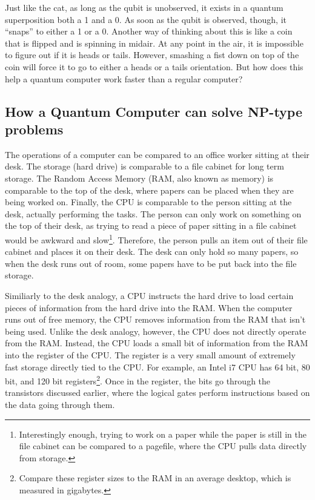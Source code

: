 \documentclass[10pt,journal,compsoc]{IEEEtran}
\begin{document}
Just like the cat, as long as the qubit is unobserved, it exists in a quantum superposition both a 1 and a 0. As soon as the qubit is observed, though, it ``snaps'' to either a 1 or a 0. Another way of thinking about this is like a coin that is flipped and is  spinning in midair. At any point in the air, it is impossible to figure out if it is heads or tails. However, smashing a fist down on top of the coin will force it to go to either a heads or a tails orientation. But how does this help a quantum computer work faster than a regular computer?







\subsection{How a Quantum Computer can solve NP-type problems}

The operations of a computer can be compared to an office worker sitting at their desk. The storage (hard drive) is comparable to a file cabinet for long term storage. The Random Access Memory (RAM, also known as memory) is comparable to the top of the desk, where papers can be placed when they are being worked on. Finally, the CPU is comparable to the person sitting at the desk, actually performing the tasks. The person can only work on something on the top of their desk, as trying to read a piece of paper sitting in a file cabinet would be awkward and slow\footnote{Interestingly enough, trying to work on a paper while the paper is still in the file cabinet can be compared to a pagefile, where the CPU pulls data directly from storage.}. Therefore, the person pulls an item out of their file cabinet and places it on their desk. The desk can only hold so many papers, so when the desk runs out of room, some papers have to be put back into the file storage. 



Similiarly to the desk analogy, a CPU instructs the hard drive to load certain pieces of information from the hard drive into the RAM. When the computer runs out of free memory, the CPU removes information from the RAM that isn't being used. Unlike the desk analogy, however, the CPU does not directly operate from the RAM. Instead, the CPU loads a small bit of information from the RAM into the register of the CPU. The register is a very small amount of extremely fast storage directly tied to the CPU. For example, an Intel i7 CPU has 64 bit, 80 bit, and 120 bit registers\footnote{Compare these register sizes to the RAM in an average desktop, which is measured in gigabytes.}. Once in the register, the bits go through the transistors discussed earlier, where the logical gates perform instructions based on the data going through them. 
\end{document}
